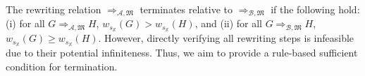 The rewriting relation \( \mathop{\Rightarrow}_{\mathcal{A},\mathfrak{M}} \) terminates relative to $\mathop{\Rightarrow}_{\mathcal{B},\mathfrak{M}}$ if the following hold: (i) for all \(G \mathop{\Rightarrow}_{\mathcal{A},\mathfrak{M}} H\), \( w_{s_\mathbb{X}}(G) \mathop{>} w_{s_\mathbb{X}}(H) \), and (ii) for all \(G \mathop{\Rightarrow}_{\mathcal{B},\mathfrak{M}} H\), \( w_{s_\mathbb{X}}(G) \mathop{\geq} w_{s_\mathbb{X}}(H) \). However, directly verifying all rewriting steps is infeasible due to their potential infiniteness. 
Thus, we aim to provide a rule-based sufficient condition for termination.
